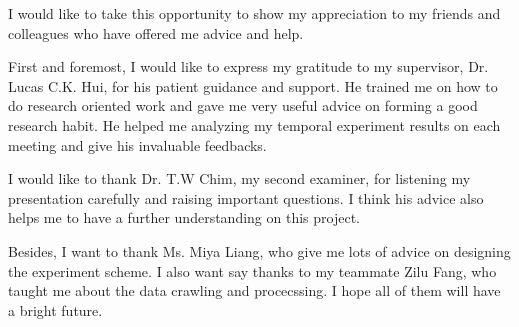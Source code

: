 \begin{acknowledgements}
I would like to take this opportunity to show my appreciation to my friends and colleagues who have offered me advice and help.

First and foremost, I would like to express my gratitude to my supervisor, Dr. Lucas C.K. Hui, for his patient guidance and support. He trained me on how to do research oriented work and gave me very useful advice on forming a good research habit. He helped me analyzing my temporal experiment results on each meeting and give his invaluable feedbacks.

I would like to thank Dr. T.W Chim, my second examiner, for listening my presentation carefully and raising important questions. I think his advice also helps me to have a further understanding on this project.

Besides, I want to thank Ms. Miya Liang, who give me lots of advice on designing the experiment scheme. I also want say thanks to my teammate Zilu Fang, who taught me about the data crawling and procecssing. I hope all of them will have a bright future.
\end{acknowledgements}
